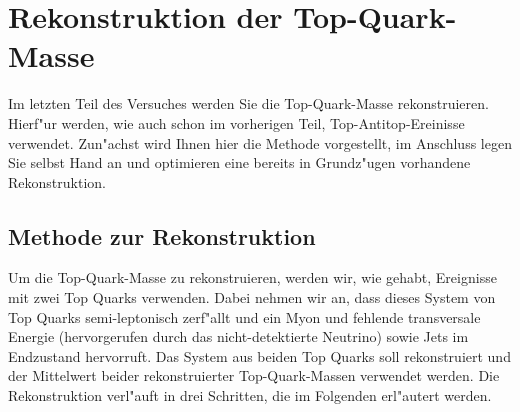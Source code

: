 \section{Rekonstruktion der Top-Quark-Masse}
\label{topreco}

Im letzten Teil des Versuches werden Sie die Top-Quark-Masse rekonstruieren. Hierf"ur werden, wie auch schon im vorherigen Teil, Top-Antitop-Ereinisse verwendet. Zun"achst wird Ihnen hier die Methode vorgestellt, im Anschluss legen Sie selbst Hand an und optimieren eine bereits in Grundz"ugen vorhandene Rekonstruktion.

\subsection{Methode zur Rekonstruktion}
\label{subsec:topreco_intro}

Um die Top-Quark-Masse zu rekonstruieren, werden wir, wie gehabt, Ereignisse mit zwei Top Quarks verwenden. Dabei nehmen wir an, dass dieses System von Top Quarks semi-leptonisch zerf"allt und ein Myon und fehlende transversale Energie (hervorgerufen durch das nicht-detektierte Neutrino) sowie Jets im Endzustand hervorruft. Das System aus beiden Top Quarks soll rekonstruiert und der Mittelwert beider rekonstruierter Top-Quark-Massen verwendet werden. Die Rekonstruktion verl"auft in drei Schritten, die im Folgenden erl"autert werden.

